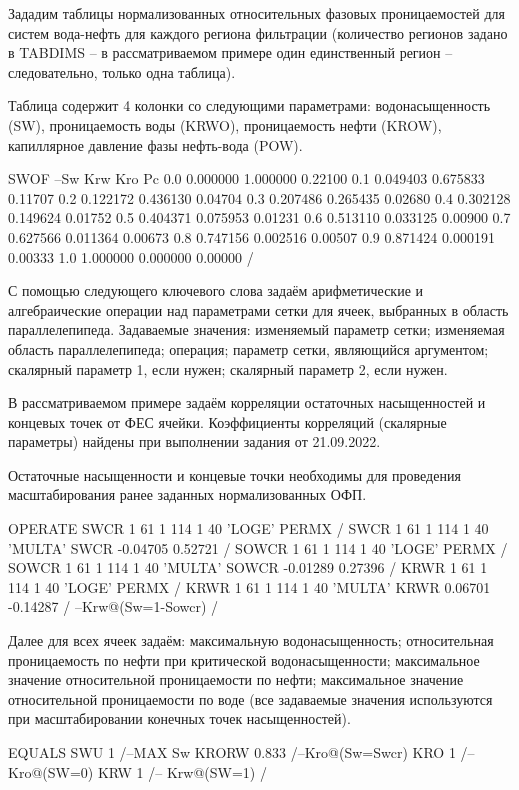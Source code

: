 Зададим таблицы нормализованных относительных фазовых проницаемостей для систем вода-нефть для каждого региона фильтрации (количество регионов задано в TABDIMS -- в рассматриваемом примере один единственный регион -- следовательно, только одна таблица).

Таблица содержит 4 колонки со следующими параметрами: водонасыщенность (SW), проницаемость воды (KRWO), проницаемость нефти (KROW), капиллярное давление фазы нефть-вода (POW).
\begin{eclrun}
SWOF
--Sw     Krw     Kro     Pc
0.0  0.000000  1.000000  0.22100
0.1  0.049403  0.675833  0.11707
0.2  0.122172  0.436130  0.04704
0.3  0.207486  0.265435  0.02680
0.4  0.302128  0.149624  0.01752
0.5  0.404371  0.075953  0.01231
0.6  0.513110  0.033125  0.00900
0.7  0.627566  0.011364  0.00673
0.8  0.747156  0.002516  0.00507
0.9  0.871424  0.000191  0.00333
1.0  1.000000  0.000000  0.00000
/
\end{eclrun}

С помощью следующего ключевого слова задаём арифметические и алгебраические операции над параметрами сетки для ячеек, выбранных в область параллелепипеда.
Задаваемые значения: изменяемый параметр сетки; изменяемая область параллелепипеда; операция; параметр сетки, являющийся аргументом; скалярный параметр 1, если нужен; скалярный параметр 2, если нужен.

В рассматриваемом примере задаём корреляции остаточных насыщенностей и концевых точек от ФЕС ячейки.
Коэффициенты корреляций (скалярные параметры) найдены при выполнении задания от 21.09.2022.

Остаточные насыщенности и концевые точки необходимы для проведения масштабирования ранее заданных нормализованных ОФП.
\begin{eclrun}
OPERATE
SWCR   1 61  1 114  1 40  'LOGE'   PERMX /
SWCR   1 61  1 114  1 40  'MULTA'  SWCR  -0.04705  0.52721  /
SOWCR  1 61  1 114  1 40  'LOGE'   PERMX /
SOWCR  1 61  1 114  1 40  'MULTA'  SOWCR  -0.01289  0.27396 /
KRWR   1 61  1 114  1 40  'LOGE'   PERMX /
KRWR   1 61  1 114  1 40  'MULTA'  KRWR   0.06701  -0.14287 /
--Krw@(Sw=1-Sowcr)
/
\end{eclrun}

Далее для всех ячеек задаём:
максимальную водонасыщенность;
относительная проницаемость по нефти при критической водонасыщенности;
максимальное значение относительной проницаемости по нефти;
максимальное значение относительной проницаемости по воде
(все задаваемые значения используются при масштабировании конечных точек насыщенностей).
\begin{eclrun}
EQUALS
SWU 1 /--MAX Sw
KRORW  0.833 /--Kro@(Sw=Swcr)
KRO 1 /-- Kro@(SW=0)
KRW 1 /-- Krw@(SW=1)
/
\end{eclrun}

